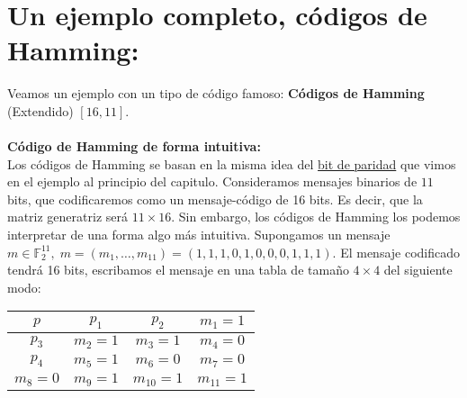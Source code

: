 \documentclass[11pt,spanish]{book}
\begin{document}
\section{Un ejemplo completo, códigos de Hamming:}
Veamos un ejemplo con un tipo de código famoso: \textbf{Códigos de Hamming} (Extendido) $[16,11]$.\\
\\ \textbf{Código de Hamming de forma intuitiva:}\\

Los códigos de Hamming se basan en la misma idea del \hyperlink{ejemplo2}{bit de paridad} que vimos en el ejemplo al principio del capitulo. Consideramos mensajes binarios de $11$ bits, que codificaremos como un mensaje-código de 16 bits. Es decir, que la matriz generatriz será $11\times 16$. Sin embargo, los códigos de Hamming los podemos interpretar de una forma algo más intuitiva. Supongamos un mensaje $m\in \mathbb{F}_{2}^{11},\;m=(m_{1},\ldots,m_{11})=(1,1,1,0,1,0,0,0,1,1,1)$. El mensaje codificado tendrá 16 bits, escribamos el mensaje en una tabla de tamaño $4\times 4$ del siguiente modo: \\
\begin{table}[ht]
\centering
\begin{tabular}{|c|c|c|c|}
\hline
\cellcolor[HTML]{9AFF99} $p$  & \cellcolor[HTML]{96FFFB}$p_{1}$ & \cellcolor[HTML]{96FFFB}$p_{2}$ & $m_{1} = 1$  \\ \hline
\cellcolor[HTML]{96FFFB}$p_{3}$ &  $m_{2} = 1$                     &  $m_{3} = 1$                      &  $m_{4} = 0$  \\ \hline
\cellcolor[HTML]{96FFFB}$p_{4}$ &  $m_{5} = 1$                      & $m_{6} = 0$                      & $m_{7} = 0$  \\ \hline
$m_{8} = 0$                      & $m_{9} = 1$                      & $m_{10} = 1$                     & $m_{11} = 1$ \\ \hline
\end{tabular}
\end{table}
\end{document}
